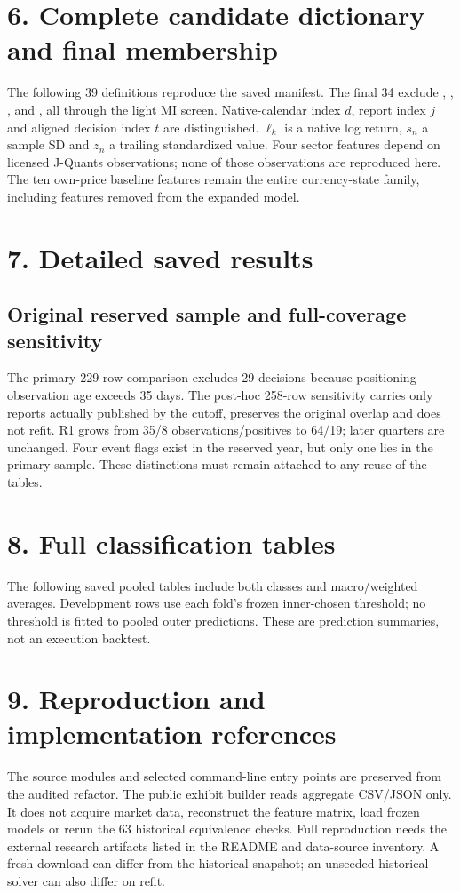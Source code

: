 \documentclass[11pt,a4paper]{article}
\begin{document}
\clearpage
\section*{6. Complete candidate dictionary and final membership}
The following 39 definitions reproduce the saved manifest. The final 34 exclude , , ,  and , all through the light MI screen. Native-calendar index $d$, report index $j$ and aligned decision index $t$ are distinguished. $\ell_k$ is a native log return, $s_n$ a sample SD and $z_n$ a trailing standardized value. Four sector features depend on licensed J-Quants observations; none of those observations are reproduced here. The ten own-price baseline features remain the entire currency-state family, including features removed from the expanded model.


\clearpage
\section*{7. Detailed saved results}

\clearpage
\subsection*{Original reserved sample and full-coverage sensitivity}


The primary 229-row comparison excludes 29 decisions because positioning observation age exceeds 35 days. The post-hoc 258-row sensitivity carries only reports actually published by the cutoff, preserves the original overlap and does not refit. R1 grows from 35/8 observations/positives to 64/19; later quarters are unchanged. Four event flags exist in the reserved year, but only one lies in the primary sample. These distinctions must remain attached to any reuse of the tables.

\clearpage
\section*{8. Full classification tables}
The following saved pooled tables include both classes and macro/weighted averages. Development rows use each fold's frozen inner-chosen threshold; no threshold is fitted to pooled outer predictions. These are prediction summaries, not an execution backtest.


\clearpage
\section*{9. Reproduction and implementation references}
The source modules and selected command-line entry points are preserved from the audited refactor. The public exhibit builder reads aggregate CSV/JSON only. It does not acquire market data, reconstruct the feature matrix, load frozen models or rerun the 63 historical equivalence checks. Full reproduction needs the external research artifacts listed in the README and data-source inventory. A fresh download can differ from the historical snapshot; an unseeded historical solver can also differ on refit.
\end{document}
